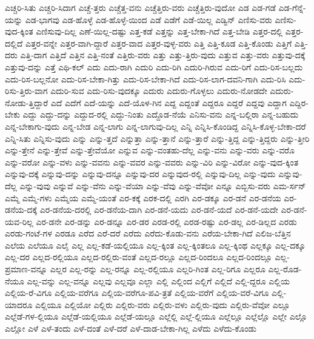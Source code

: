 {ಎಚ್ಚರಿ-ಸಿತು
ಎಚ್ಚರಿ-ಸಿದಾಗ
ಎಚ್ಚೆ-ತ್ತರು
ಎಚ್ಚೆತ್ತ-ವನು
ಎಚ್ಚೆತ್ತಿರು-ವರು
ಎಚ್ಚೆತ್ತಿರು-ವುದೋ
ಎಡ
ಎಡ-ಗಡೆ
ಎಡ-ಗೆನ್ನೆ-ಯನ್ನು
ಎಡ-ಭಾಗವು
ಎಡ-ಹೊಳ್ಳೆ
ಎಡ-ಹೊಳ್ಳೆ-ಯಿಂದ
ಎಡೆ
ಎಡೆಗೆ
ಎಡೆ-ಯಿಲ್ಲ
ಎಡ್ವಿನ್
ಎಣಿಸು-ವರು
ಎಣಿಸು-ವುದ-ಕ್ಕಿಂತ
ಎಣಿಸುವು-ದಿಲ್ಲ
ಎಣೆ-ಯಿಲ್ಲ-ದಷ್ಟು
ಎತ್ತ-ಕಡೆ
ಎತ್ತನ್ನು
ಎತ್ತ-ಬೇಕಾ-ಗಿದೆ
ಎತ್ತ-ಬೇಡಿ
ಎತ್ತರ-ದಲ್ಲಿ
ಎತ್ತರ-ದಲ್ಲಿದೆ
ಎತ್ತರ-ವನ್ನೇ
ಎತ್ತರ-ವಾಗಿ-ದ್ದಾರೆ
ಎತ್ತರ-ವಾದ
ಎತ್ತರ-ವುಳ್ಳ-ವರು
ಎತ್ತಿ
ಎತ್ತಿ-ಕೂಡ
ಎತ್ತಿ-ಕೊಂಡು
ಎತ್ತಿಗೆ
ಎತ್ತಿ-ದರು
ಎತ್ತಿ-ದಾಗ
ಎತ್ತಿದೆ
ಎತ್ತಿನ
ಎತ್ತಿ-ನಂತೆ
ಎತ್ತಿರು-ವರು
ಎತ್ತು
ಎತ್ತು-ತ್ತಿರು-ವುದು
ಎತ್ತುವ
ಎತ್ತು-ವರು
ಎತ್ತುವು-ದಕ್ಕೆ
ಎತ್ತುವು-ದನ್ನು
ಎತ್ತೆ
ಎಥಿ-ಕಲ್
ಎದು
ಎದು-ರಾಗಿ
ಎದುರಿ
ಎದು-ರಿಗಿ
ಎದುರಿ-ಗಿರುವ
ಎದು-ರಿಗೆ
ಎದು-ರಿಸ-ಬಲ್ಲದು
ಎದು-ರಿಸ-ಬಲ್ಲನೋ
ಎದು-ರಿಸ-ಬೇಕಾ-ಗಿತ್ತು
ಎದು-ರಿಸ-ಬೇಕಾ-ಗಿದೆ
ಎದು-ರಿಸ-ಲಾಗ-ದವನಿ-ಗಾಗಿ
ಎದು-ರಿಸಿ
ಎದು-ರಿಸು-ತ್ತಿರು-ವಾಗ
ಎದುರಿ-ಸುವ
ಎದು-ರಿಸು-ವುದಕ್ಕೂ
ಎದುರು
ಎದುರು-ಗೊಳ್ಳಲು
ಎದುರು-ನೋಡದೇ
ಎದುರು-ನೋಡು-ತ್ತಿದ್ದಾರೆ
ಎದೆ
ಎದೆಗೆ
ಎದೆ-ಯನ್ನು
ಎದೆ-ಯೊಳ-ಗಿನ
ಎದ್ದ
ಎದ್ದಂತೆ
ಎದ್ದರೂ
ಎದ್ದರೆ
ಎದ್ದವು
ಎದ್ದಾಗ
ಎದ್ದಿರ-ಬೇಕು
ಎದ್ದು
ಎದ್ದು-ದನ್ನು
ಎದ್ದುದ-ರಲ್ಲಿ
ಎದ್ದು-ನಿಂತು
ಎದ್ದೊಡ-ನೆಯೆ
ಎನಿಸು-ವನು
ಎನ್ನ-ಬಲ್ಲಿರಾ
ಎನ್ನ-ಬಹುದು
ಎನ್ನ-ಬೇಕಾಗು-ವುದು
ಎನ್ನ-ಬೇಡ
ಎನ್ನ-ಲಾಗು
ಎನ್ನ-ಲಾಗುವು-ದಿಲ್ಲ
ಎನ್ನಿ
ಎನ್ನಿಸಿ-ಕೊಂಡಿದ್ದ
ಎನ್ನಿಸಿ-ಕೊಳ್ಳ-ಬೇಕಾ-ದರೆ
ಎನ್ನಿ-ಸಿತು
ಎನ್ನಿಸು-ವುದು
ಎನ್ನು
ಎನ್ನು-ತ್ತದೆ
ಎನ್ನುತ್ತಾ
ಎನ್ನು-ತ್ತಾನೆ
ಎನ್ನು-ತ್ತಾರೆ
ಎನ್ನು-ತ್ತಿದ್ದ
ಎನ್ನು-ತ್ತಿದ್ದರು
ಎನ್ನು-ತ್ತೀರಿ
ಎನ್ನು-ತ್ತೇನೆ
ಎನ್ನು-ತ್ತೇವೆ
ಎನ್ನು-ತ್ತೇವೆಯೋ
ಎನ್ನುವ
ಎನ್ನು-ವಂತಹು-ದೆಲ್ಲ
ಎನ್ನು-ವನು
ಎನ್ನು-ವರು
ಎನ್ನು-ವರೊ
ಎನ್ನು-ವರೋ
ಎನ್ನು-ವಳು
ಎನ್ನು-ವವನು
ಎನ್ನು-ವವರ
ಎನ್ನು-ವವರು
ಎನ್ನು-ವಿರಿ
ಎನ್ನು-ವಿರೋ
ಎನ್ನು-ವುದ-ಕ್ಕಿಂತ
ಎನ್ನುವು-ದಕ್ಕೆ
ಎನ್ನುವು-ದನ್ನು
ಎನ್ನುವು-ದನ್ನೂ
ಎನ್ನುವು-ದರ
ಎನ್ನುವುದ-ರಲ್ಲಿ
ಎನ್ನುವು-ದಿಲ್ಲ
ಎನ್ನು-ವುದು
ಎನ್ನುವು-ದೆಲ್ಲ
ಎನ್ನು-ವುವು
ಎನ್ನುವೆ
ಎನ್ನು-ವೆನು
ಎನ್ನು-ವೆಯಾ
ಎನ್ನು-ವೆವು
ಎನ್ನು-ವೆವೋ
ಎನ್ನೂ
ಎಬ್ಬಿಸು-ವರು
ಎಮ-ರ್ಸನ್
ಎಮ್ಮೆ
ಎಮ್ಮೆ-ಗಳು
ಎಮ್ಮೆಯ
ಎಮ್ಮೆ-ಯಂತೆ
ಎರ-ಕಕ್ಕೆ
ಎರಕ-ದಲ್ಲಿ
ಎರಗಿ
ಎರ-ಡಕ್ಕೂ
ಎರ-ಡನೆ
ಎರ-ಡನೆಯ
ಎರ-ಡನೆಯ-ದಕ್ಕೆ
ಎರ-ಡನೆಯ-ದರಲ್ಲಿ
ಎರ-ಡನೆಯ-ದಾಗಿ
ಎರ-ಡನೆ-ಯದು
ಎರ-ಡನೆ-ಯದೆ
ಎರ-ಡನೆ-ಯದೇ
ಎರ-ಡನೆ-ಯವ-ರಿಲ್ಲ
ಎರ-ಡನೇ
ಎರ-ಡನ್ನು
ಎರ-ಡನ್ನೂ
ಎರ-ಡರ
ಎರಡ-ರಲ್ಲಿ
ಎರಡ-ರಷ್ಟು
ಎರ-ಡಲ್ಲ
ಎರ-ಡಿಲ್ಲದ
ಎರಡು
ಎರಡು-ಗಂಟೆ-ಗಳ
ಎರಡೂ
ಎರೆದ
ಎರೆ-ದರೆ
ಎರೆದು
ಎರೆದು-ಕೊಡು-ವನು
ಎರೆಯ-ಬೇಕಾ-ಗಿದೆ
ಎಲಿಜ-ಬೆತ್ತಿನ
ಎಲೆಯ
ಎಲೆಯೂ
ಎಲೈ
ಎಲ್ಲ
ಎಲ್ಲ-ಕಡೆ-ಯಲ್ಲಿಯೂ
ಎಲ್ಲ-ಕ್ಕಿಂತ
ಎಲ್ಲ-ಕ್ಕಿಂತಲೂ
ಎಲ್ಲ-ಕ್ಕಿಂಥ
ಎಲ್ಲಕ್ಕೂ
ಎಲ್ಲ-ದಕ್ಕೂ
ಎಲ್ಲ-ದರ
ಎಲ್ಲದ-ರಲ್ಲಿಯೂ
ಎಲ್ಲದ-ರಲ್ಲಿರು-ವಂತೆ
ಎಲ್ಲದ-ರಲ್ಲೂ
ಎಲ್ಲದ-ರಿಂದಲೂ
ಎಲ್ಲದ-ರಿಂದಲ್ಲೂ
ಎಲ್ಲ-ಪ್ರಮಾಣ-ವನ್ನೂ
ಎಲ್ಲರ
ಎಲ್ಲ-ರನ್ನು
ಎಲ್ಲ-ರನ್ನೂ
ಎಲ್ಲ-ರಲ್ಲಿಯೂ
ಎಲ್ಲರಿ-ಗಿಂತ
ಎಲ್ಲ-ರಿಗೂ
ಎಲ್ಲರೂ
ಎಲ್ಲ-ರೊಡ-ನೆಯೂ
ಎಲ್ಲ-ವನ್ನು
ಎಲ್ಲ-ವನ್ನೂ
ಎಲ್ಲವು
ಎಲ್ಲವೂ
ಎಲ್ಲಾ
ಎಲ್ಲಿ
ಎಲ್ಲಿಂದ
ಎಲ್ಲಿಗೆ
ಎಲ್ಲಿದೆ
ಎಲ್ಲಿ-ದ್ದರೂ
ಎಲ್ಲಿಯ
ಎಲ್ಲಿಯ-ರೆ-ವಿಗೂ
ಎಲ್ಲಿಯ-ವರೆಗೂ
ಎಲ್ಲಿಯ-ವರೆಗೂ-ಪವಿ-ತ್ರತೆ
ಎಲ್ಲಿಯ-ವರೆಗೆ
ಎಲ್ಲಿಯ-ವರೆ-ವಿಗೂ
ಎಲ್ಲಿ-ಯಾದರೂ
ಎಲ್ಲಿಯೂ
ಎಲ್ಲಿಯೋ
ಎಲ್ಲಿರು
ಎಲ್ಲಿರು-ವರು
ಎಲ್ಲಿರು-ವಳು
ಎಲ್ಲಿರು-ವುದು
ಎಲ್ಲಿರು-ವೆವೋ
ಎಲ್ಲೂ
ಎಲ್ಲೆಡೆ-ಗಳ-ಲ್ಲಿಯೂ
ಎಲ್ಲೆಡೆ-ಯಲ್ಲಿಯೂ
ಎಲ್ಲೆಡೆ-ಯಲ್ಲೂ
ಎಲ್ಲೆಲ್ಲಿ
ಎಲ್ಲೆ-ಲ್ಲಿಯೂ
ಎಲ್ಲೆಲ್ಲೂ
ಎಲ್ಲೆಲ್ಲೊ
ಎಲ್ಲೇ
ಎಲ್ಲೊ
ಎಲ್ಲೋ
ಎಳೆ
ಎಳೆ-ತಂದು
ಎಳೆ-ದಂತೆ
ಎಳೆ-ದರೆ
ಎಳೆ-ದಾಡ-ಬೇಕಾ-ಗಿಲ್ಲ
ಎಳೆದು
ಎಳೆದು-ಕೊಂಡು
}
